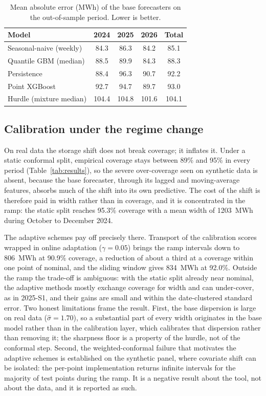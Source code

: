 \documentclass[preprint,3p,times]{elsarticle}
\begin{document}
\begin{table}[t]
\centering
\caption{Mean absolute error (MWh) of the base forecasters on the out-of-sample period. Lower is better.}
\label{tab:mae}
\begin{tabular}{lcccc}
\toprule
Model & 2024 & 2025 & 2026 & Total \\
\midrule
Seasonal-naive (weekly)      & 84.3 & 86.3 & 84.2 & 85.1 \\
Quantile GBM (median)        & 88.5 & 89.9 & 84.3 & 88.3 \\
Persistence                  & 88.4 & 96.3 & 90.7 & 92.2 \\
Point XGBoost                & 92.7 & 94.7 & 89.7 & 93.0 \\
Hurdle (mixture median)      & 104.4 & 104.8 & 101.6 & 104.1 \\
\bottomrule
\end{tabular}
\end{table}

\subsection{Calibration under the regime change}

On real data the storage shift does not break coverage; it inflates it. Under a static conformal split, empirical coverage stays between 89\% and 95\% in every period (Table~\ref{tab:results}), so the severe over-coverage seen on synthetic data is absent, because the base forecaster, through its lagged and moving-average features, absorbs much of the shift into its own predictive. The cost of the shift is therefore paid in width rather than in coverage, and it is concentrated in the ramp: the static split reaches 95.3\% coverage with a mean width of 1203~MWh during October to December 2024.

The adaptive schemes pay off precisely there. Transport of the calibration scores wrapped in online adaptation ($\gamma=0.05$) brings the ramp intervals down to 806~MWh at 90.9\% coverage, a reduction of about a third at a coverage within one point of nominal, and the sliding window gives 834~MWh at 92.0\%. Outside the ramp the trade-off is ambiguous: with the static split already near nominal, the adaptive methods mostly exchange coverage for width and can under-cover, as in 2025-S1, and their gains are small and within the date-clustered standard error. Two honest limitations frame the result. First, the base dispersion is large on real data ($\hat\sigma=1.70$), so a substantial part of every width originates in the base model rather than in the calibration layer, which calibrates that dispersion rather than removing it; the sharpness floor is a property of the hurdle, not of the conformal step. Second, the weighted-conformal failure that motivates the adaptive schemes is established on the synthetic panel, where covariate shift can be isolated: the per-point implementation returns infinite intervals for the majority of test points during the ramp. It is a negative result about the tool, not about the data, and it is reported as such.
\end{document}
